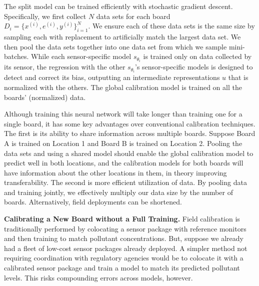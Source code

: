 \documentclass[journal abbreviation, manuscript]{copernicus}
\newcommand\todo[1]{\textcolor{red}{#1}}
\begin{document}
The split model can be trained efficiently with stochastic gradient descent. Specifically, we first collect $N$ data sets for each board $D_i = \{x^{(i)}, e^{(i)}, y^{(i)}\}_{i = 1}^N$. We ensure each of these data sets is the same size by sampling each with replacement to artificially match the largest data set. We then pool the data sets together into one data set from which we sample mini-batches. While each sensor-specific model $s_{\theta_i}$ is trained only on data collected by its sensor, the regression with the other $s_{\theta_i}$'s sensor-specific models is designed to detect and correct its bias, outputting an intermediate representations $u$ that is normalized with the others.  The global calibration model is trained on all the boards' (normalized) data.


Although training this neural network will take longer than training one for a single board, it has some key advantages over conventional calibration techniques. The first is its ability to share information across multiple boards. Suppose Board A is trained on Location 1 and Board B is trained on Location 2. Pooling the data sets and using a shared model should enable the global calibration model to predict well in both locations, and the calibration models for both boards will have information about the other locations in them, in theory improving transferability. The second is more efficient utilization of data. By pooling data and training jointly, we effectively multiply our data size by the number of boards.  Alternatively, field deployments can be shortened.

\textbf{Calibrating a New Board without a Full Training.}  Field calibration is traditionally performed by colocating a sensor package with reference monitors and then training to match pollutant concentrations.  But, suppose we already had a fleet of low-cost sensor packages already deployed.  A simpler method not requiring coordination with regulatory agencies would be to colocate it with a calibrated sensor package and train a model to match its predicted pollutant levels. This risks compounding errors across models, however. 
\end{document}
